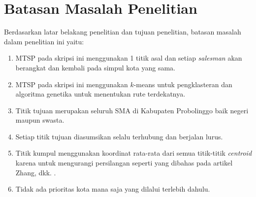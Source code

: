 \section{Batasan Masalah Penelitian}

Berdasarkan latar belakang penelitian dan tujuan penelitian, batasan masalah dalam penelitian ini yaitu:

\begin{enumerate}
	\item MTSP pada skripsi ini menggunakan 1 titik asal dan setiap \textit{salesman} akan berangkat dan kembali pada simpul kota yang sama.
	\item MTSP pada skripsi ini menggunakan $k$-means untuk pengklasteran dan algoritma genetika untuk menentukan rute terdekatnya.
	\item Titik tujuan merupakan seluruh SMA di Kabupaten Probolinggo baik negeri maupun swasta.
	\item Setiap titik tujuan diasumsikan selalu terhubung dan berjalan lurus.
	\item Titik kumpul menggunakan koordinat rata-rata dari semua titik-titik \textit{centroid} karena untuk mengurangi persilangan seperti yang dibahas pada artikel Zhang, dkk. \cite{inproceedings}.
	\item Tidak ada prioritas kota mana saja yang dilalui terlebih dahulu.
\end{enumerate}